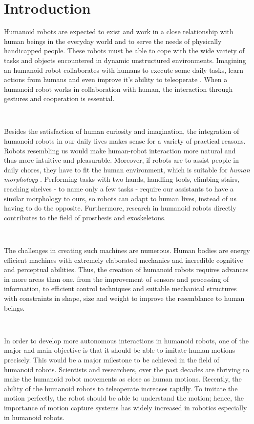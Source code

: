 \chapter{Introduction}

Humanoid robots are expected to exist and work in a close relationship with human beings in the everyday world and 
to serve the needs of physically handicapped people. These robots must be able to cope with the wide variety of tasks
and objects encountered in dynamic unstructured environments. Imagining an humanoid robot collaborates with humans 
to execute some daily tasks, learn actions from humans and even improve it's ability to teleoperate \cite{FUKAYA2001273}.
When a humanoid robot works in collaboration with human, the interaction through gestures and cooperation is essential. 

~

Besides the satisfaction of human curiosity and imagination, the integration of humanoid robots in our daily lives makes
sense for a variety of practical reasons. Robots resembling us would make human-robot interaction more natural and thus
more intuitive and pleasurable. Moreover, if robots are to assist people in daily chores, they have to fit the human 
environment, which is suitable for \textit{human morphology} \cite{Kemp2008}. Performing tasks with two hands, handling
tools, climbing stairs, reaching shelves - to name only a few tasks - require our assistants to have a similar 
morphology to ours, so robots can adapt to human lives, instead of us having to do the opposite. Furthermore, 
research in humanoid robots directly contributes to the field of prosthesis and exoskeletons.

~

The challenges in creating such machines are numerous. Human bodies are energy efficient machines with extremely elaborated 
mechanics and incredible cognitive and perceptual abilities. Thus, the creation of humanoid robots requires advances in 
more areas than one, from the improvement of sensors and processing of information, to efficient control techniques and 
suitable mechanical structures with constraints in shape, size and weight to improve the resemblance to human beings.

~

In order to develop more autonomous interactions in humanoid robots, one of the major and main objective is that it should
be able to imitate human motions precisely. This would be a major milestone to be achieved in the field of humanoid robots.
Scientists and researchers, over the past decades are thriving to make the humanoid robot movements as close as human 
motions. Recently, the ability of the humanoid robots to teleoperate increases rapidly. To imitate the motion perfectly,
the robot should be able to understand the motion; hence, the importance of motion capture systems has widely increased
in robotics especially in humanoid robots.

